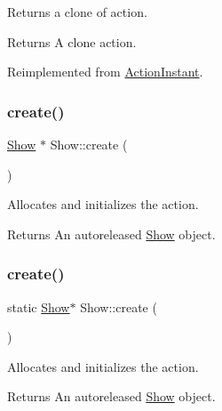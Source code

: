 Returns a clone of action.

\begin{DoxyReturn}{Returns}
A clone action. 
\end{DoxyReturn}


Reimplemented from \hyperlink{classActionInstant_adb76fc6f006098109e8256210cbd8cc0}{Action\+Instant}.

\mbox{\label{classShow_a769dba1bfa26dae65242d6aa4a217f19}} 
\subsubsection{\texorpdfstring{create()}{create()}\hspace{0.1cm}{\footnotesize\ttfamily [1/2]}}
{\footnotesize\ttfamily \hyperlink{classShow}{Show} $\ast$ Show\+::create (\begin{DoxyParamCaption}{ }\end{DoxyParamCaption})\hspace{0.3cm}{\ttfamily [static]}}

Allocates and initializes the action.

\begin{DoxyReturn}{Returns}
An autoreleased \hyperlink{classShow}{Show} object. 
\end{DoxyReturn}
\mbox{\label{classShow_a5310b43324109bc4d12bd2b42eaceced}} 
\subsubsection{\texorpdfstring{create()}{create()}\hspace{0.1cm}{\footnotesize\ttfamily [2/2]}}
{\footnotesize\ttfamily static \hyperlink{classShow}{Show}$\ast$ Show\+::create (\begin{DoxyParamCaption}{ }\end{DoxyParamCaption})\hspace{0.3cm}{\ttfamily [static]}}

Allocates and initializes the action.

\begin{DoxyReturn}{Returns}
An autoreleased \hyperlink{classShow}{Show} object. 
\end{DoxyReturn}
\mbox{\label{classShow_a986a611688bc5f0252bb565682f52571}} 
